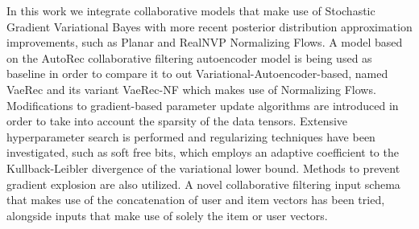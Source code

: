 In this work we integrate collaborative models that make use of Stochastic Gradient
Variational Bayes with more recent posterior distribution approximation improvements,
such as Planar and RealNVP Normalizing Flows.
A model based on the AutoRec collaborative filtering autoencoder model is being
used as baseline in order to compare it to out Variational-Autoencoder-based, named VaeRec and
its variant VaeRec-NF which makes use of Normalizing Flows.
Modifications to gradient-based parameter update algorithms are introduced
in order to take into account the sparsity of the data tensors.
Extensive hyperparameter search is performed and regularizing techniques have been investigated, such as soft free bits, which employs an adaptive
coefficient to the Kullback-Leibler divergence of the variational lower bound.
Methods to prevent gradient explosion are also utilized.
A novel collaborative filtering input schema that makes use of the concatenation of user 
and item vectors has been tried, 
alongside inputs that make use of solely the item or user vectors.
